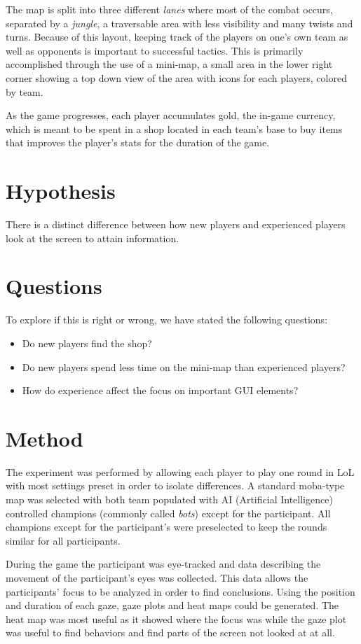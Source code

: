 \documentclass[notitlepage]{report}
\begin{document}
The map is split into three different \emph{lanes} where most of the combat occurs, separated by a \emph{jungle}, a traversable area with less visibility and many twists and turns. Because of this layout, keeping track of the players on one's own team as well as opponents is important to successful tactics. This is primarily accomplished through the use of a mini-map, a small area in the lower right corner showing a top down view of the area with icons for each players, colored by team.

As the game progresses, each player accumulates gold, the in-game currency, which is meant to be spent in a shop located in each team's base to buy items that improves the player's stats for the duration of the game.

\section{Hypothesis}
There is a distinct difference between how new players and experienced players look at the screen to attain information.

\section{Questions}
To explore if this is right or wrong, we have stated the following questions:

\begin{itemize}
\item Do new players find the shop?
\item Do new players spend less time on the mini-map than experienced players?
\item How do experience affect the focus on important GUI elements?
\end{itemize}

\section{Method}
The experiment was performed by allowing each player to play one round in LoL with most settings preset in order to isolate differences. A standard moba-type map was selected with both team populated with AI (Artificial Intelligence) controlled champions (commonly called \emph{bots}) except for the participant. All champions except for the participant's were preselected to keep the rounds similar for all participants.

During the game the participant was eye-tracked and data describing the movement of the participant's eyes was collected. This data allows the participants’ focus to be analyzed in order to find conclusions. Using the position and duration of each gaze, gaze plots and heat maps could be generated. The heat map was most useful as it showed where the focus was while the gaze plot was useful to find behaviors and find parts of the screen not looked at at all.
\end{document}
